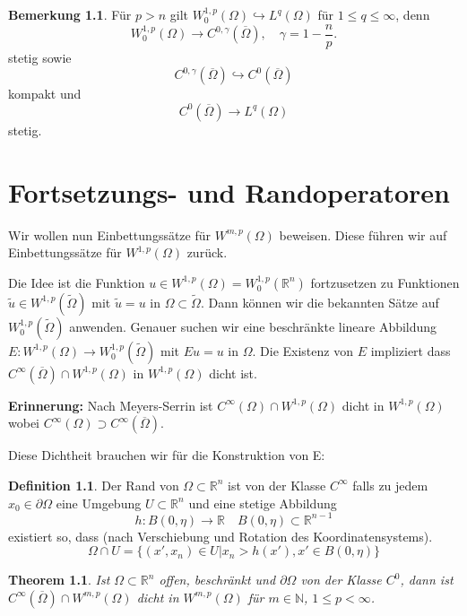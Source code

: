 \documentclass[
paper=a4,
bibtotocnumbered,
liststotocnumbered,
tablecaptionabove,
pointlessnumbers,
twoside,
openright,
10pt
]
{report}
\newtheorem{thm}{Theorem}[chapter]
\theoremstyle{definition}
\newtheorem*{df}{Definition}
\newtheorem*{rem}{Bemerkung}
\numberwithin{equation}{chapter}
\begin{document}
\begin{rem}
 Für $p>n$ gilt $W_0^{1,p}(\Omega) \hookrightarrow L^q(\Omega)$ für $1\le q \le\infty$, denn 
 \begin{equation}
  W_0^{1,p}(\Omega) \to C^{0,\gamma}(\overline{\Omega}), \quad \gamma = 1-\frac{n}{p}.
 \end{equation}
 stetig sowie 
 \begin{equation}
  C^{0,\gamma}(\overline{\Omega}) \hookrightarrow C^0(\overline{\Omega})
 \end{equation}
kompakt und
 \begin{equation}
  C^0(\overline{\Omega}) \to L^q(\Omega)
 \end{equation}
 stetig.
 
 \chapter{Fortsetzungs- und Randoperatoren}

 Wir wollen nun Einbettungssätze für $W^{m,p}(\Omega)$ beweisen. Diese führen wir auf Einbettungssätze für $W^{1,p}(\Omega)$ zurück.  

 Die Idee ist die Funktion $u\in W^{1,p}(\Omega)=W_0^{1,p}(\mathbb R^n)$ fortzusetzen zu Funktionen $\tilde u \in W^{1,p}(\tilde \Omega)$ mit $\tilde u = u$ in $\Omega\subset \tilde \Omega$.   Dann können wir die bekannten Sätze auf $W_0^{1,p}(\tilde \Omega)$ anwenden.   Genauer suchen wir eine beschränkte lineare Abbildung $E: W^{1,p}(\Omega)\to W_0^{1,p}(\tilde \Omega)$ mit $Eu=u$ in $\Omega$.  Die Existenz von $E$ impliziert dass $C^\infty(\overline{\Omega}) \cap W^{1,p}(\Omega)$ in $W^{1,p}(\Omega)$ dicht ist.
 
 \textbf{Erinnerung:} Nach Meyers-Serrin ist $C^\infty(\Omega) \cap W^{1,p}(\Omega)$ dicht in $W^{1,p}(\Omega)$ wobei $C^\infty(\Omega) \supset C^\infty(\overline{\Omega})$.

Diese Dichtheit brauchen wir für die Konstruktion von E:
\end{rem}

\begin{df}
 Der Rand von $\Omega\subset \mathbb R^n$ ist von der Klasse $C^\infty$ falls zu jedem $x_0 \in \partial \Omega$ eine Umgebung $U\subset \mathbb R^n$ und eine stetige Abbildung
 \begin{equation}
  h: B(0, \eta) \to \mathbb R \quad B(0,\eta) \subset \mathbb R^{n-1}
 \end{equation}
existiert so, dass (nach Verschiebung und Rotation des Koordinatensystems).
\begin{equation}
 \Omega \cap U = \{ (x', x_n) \in U| x_n >h(x') , x'\in B(0, \eta)\}
\end{equation}
\end{df}
\begin{thm}\label{thm3.9}
 Ist $\Omega \subset \mathbb R^n$ offen, beschränkt und $\partial \Omega$ von der Klasse $C^0$, dann ist $C^\infty(\overline{\Omega}) \cap W^{m,p}(\Omega)$ dicht in $W^{m,p}(\Omega)$ für $m\in \mathbb N$, $1\le p <\infty$.
\end{thm}
\end{document}

